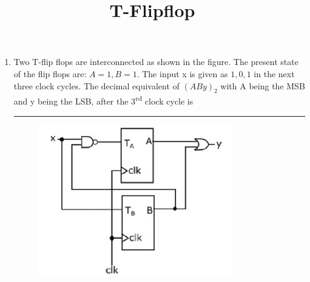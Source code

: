 \documentclass{article}
\begin{document}
\title{T-Flipflop}
\begin{enumerate}
	\item Two T-flip flops are interconnected as shown in the figure. The present state of the flip flops are: $A = 1, B = 1$. The input x is given as $1, 0, 1$ in the next three clock cycles. The decimal equivalent of $(ABy)_{2}$ with A being the MSB and y being the LSB, after the 3\textsuperscript{rd} clock cycle is \rule{12mm}{0.4pt}
	\begin{figure}[ht]
		\centering
			\includegraphics[width=\columnwidth]{figs/cktdiag.png}
		\caption{}
		\label{fig:cktdiag}
	\end{figure}
\end{enumerate}
\end{document}
